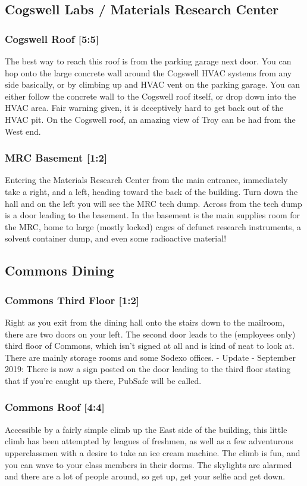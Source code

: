 \documentclass{article}
\begin{document}
\pagebreak
\subsection{Cogswell Labs / Materials Research Center}
\subsubsection{Cogswell Roof [5:5]}
The best way to reach this roof is from the parking garage next door. You can hop onto the large concrete wall around the Cogswell HVAC systems from any side basically, or by climbing up and HVAC vent on the parking garage. You can either follow the concrete wall to the Cogswell roof itself, or drop down into the HVAC area. Fair warning given, it is deceptively hard to get back out of the HVAC pit. On the Cogswell roof, an amazing view of Troy can be had from the West end.
\subsubsection{MRC Basement [1:2]}
Entering the Materials Research Center from the main entrance, immediately take a right, and a left, heading toward the back of the building. Turn down the hall and on the left you will see the MRC tech dump. Across from the tech dump is a door leading to the basement. In the basement is the main supplies room for the MRC, home to large (mostly locked) cages of defunct research instruments, a solvent container dump, and even some radioactive material!


\pagebreak
\subsection{Commons Dining}
\subsubsection{Commons Third Floor [1:2]}
Right as you exit from the dining hall onto the stairs down to the mailroom, there are two doors on your left. The second door leads to the (employees only) third floor of Commons, which isn’t signed at all and is kind of neat to look at. There are mainly storage rooms and some Sodexo offices.
- Update - September 2019: There is now a sign posted on the door leading to the third floor stating that if you’re caught up there, PubSafe will be called.
\subsubsection{Commons Roof [4:4]}
Accessible by a fairly simple climb up the East side of the building, this little climb has been attempted by leagues of freshmen, as well as a few adventurous upperclassmen with a desire to take an ice cream machine. The climb is fun, and you can wave to your class members in their dorms. The skylights are alarmed and there are a lot of people around, so get up, get your selfie and get down.
\end{document}
